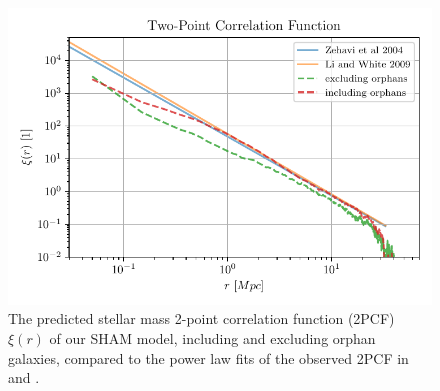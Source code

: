 \begin{figure}
  \centering
  \includegraphics[width=\linewidth, keepaspectratio]{images/correlation.pdf}%
  \caption{The  predicted stellar  mass  2-point correlation  function
    (2PCF) $\xi(r)$ of our SHAM  model, including and excluding orphan
    galaxies, compared to  the power law fits of the  observed 2PCF in
    \citet{LiWhite} and \citet{Correlation1}.
  }%
  \label{fig:correlations}
\end{figure}

